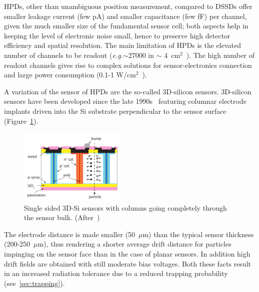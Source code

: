  
 HPDs, other than unambiguous position measurement, compared to DSSDs offer 
 smaller leakage current (few pA) and smaller capacitance (few fF) per channel, 
 given the much smaller size of the 
 fundamental sensor cell; both aspects help in keeping the level of electronic noise small, hence 
 to preserve high detector efficiency and spatial resolution.
 The main limitation of HPDs is the elevated number of channels to be readout ({\it e.g.}$\sim$27000 
 in $\sim$ 4~cm$^2$~\cite{IBLTDR}). 
 The high number 
 of readout channels gives rise to complex solutions for sensor-electronics connection and 
 large power consumption (0.1-1 W/cm$^2$~\cite{IBLTDR}).

A variation of the sensor of HPDs are the so-called 3D-silicon sensors. 3D-silicon sensors have been 
developed since the late 1990s~\cite{PARKER1997328} 
featuring columnar electrode implants driven into the Si substrate perpendicular to the sensor surface 
(Figure~\ref{fig:tredi}).

 \begin{figure}[htbp]
   \centering
  \includegraphics[width=0.45\textwidth]{tredi.pdf} 
      \caption{\label{fig:tredi}Single sided 3D-Si sensors with columns going completely through the 
      sensor bulk. (After~\cite{Garcia-Sciveres:2017ymt})}
\end{figure}
The electrode distance is made smaller (50~$\mu$m) than the typical sensor thickness 
(200-250~$\mu$m), thus rendering a shorter average drift distance for particles impinging on the sensor 
face than in the case of planar sensors. In addition high drift fields are obtained with still moderate bias 
voltages. Both these facts result in an increased radiation tolerance due to a reduced trapping 
probability (see~\ref{sec:trapping}).

